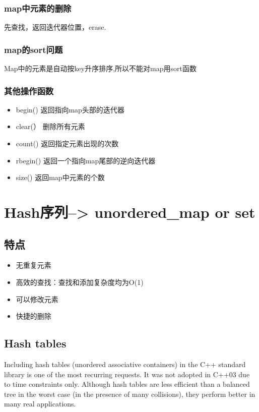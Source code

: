 \documentclass[UTF8,a4paper,12pt]{ctexbook}
\begin{document}
		\subsubsection{map中元素的删除}
			先查找，返回迭代器位置，erase.
			
		\subsubsection{map的sort问题} 
			Map中的元素是自动按key升序排序,所以不能对map用sort函数 
		
		\subsubsection{其他操作函数}
			\begin{itemize}
				\item begin()          返回指向map头部的迭代器
				\item clear(）         删除所有元素
				\item count()          返回指定元素出现的次数
				\item rbegin()         返回一个指向map尾部的逆向迭代器
				\item size()           返回map中元素的个数
			\end{itemize}
	 	
	 	
\newpage
\section{Hash序列--> unordered\_map or set}	
	\subsection{特点}
		\begin{itemize}
			\item 无重复元素
			\item 高效的查找：查找和添加复杂度均为O(1)
			\item 可以修改元素
			\item 快捷的删除
		\end{itemize}
	\subsection{Hash tables}
		Including hash tables (unordered associative containers) in the C++ standard library is one of the most recurring requests. It was not adopted in C++03 due to time constraints only. Although hash tables are less efficient than a balanced tree in the worst case (in the presence of many collisions), they perform better in many real applications.
		
\end{document}
